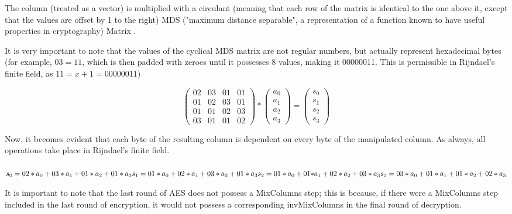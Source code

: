 \documentclass[12pt]{report}
\theoremstyle{definition}
\theoremstyle{remark}
\begin{document}
The column (treated as a vector) is multiplied with a circulant (meaning that each row of the matrix is identical to the one above it, except that the values are offset by 1 to the right) MDS ("maximum distance separable", a representation of a function known to have useful properties in cryptography) Matrix \cite{MixColumns}.

It is very important to note that the values of the cyclical MDS matrix are not regular numbers, but actually represent hexadecimal bytes (for example, $03 = 11$, which is then padded with zeroes until it possesses 8 values, making it 00000011. This is permissible in Rijndael's finite field, as $11 = x+1 = 00000011$)

\[ \left( \begin{array}{cccc}
02 & 03 & 01 & 01 \\
01 & 02 & 03 & 01 \\
01 & 01 & 02 & 03 \\
03 & 01 & 01 & 02\end{array} \right)
*
\left( \begin{array}{c}
a_0 \\
a_1 \\
a_2 \\
a_3\end{array} \right)
=
\left( \begin{array}{c}
s_0 \\
s_1 \\
s_2 \\
s_3\end{array} \right)
\]

Now, it becomes evident that each byte of the resulting column is dependent on every byte of the manipulated column. As always, all operations take place in Rijndael's finite field. \\
\\
$
s_0 = {02}*a_0+{03}*a_1+{01}*a_2+{01}*a_3 \\
s_1 = {01}*a_0+{02}*a_1+{03}*a_2+{01}*a_3 \\
s_2 = {01}*a_0+{01*}a_1+{02}*a_2+{03}*a_3 \\
s_3 = {03}*a_0+{01}*a_1+{01}*a_2+{02}*a_3 \\ $

It is important to note that the last round of AES does not possess a MixColumns step; this is because, if there were a MixColumns step included in the last round of encryption, it would not possess a corresponding invMixColumns in the final round of decryption\cite{NoMixColumns}.
\end{document}
